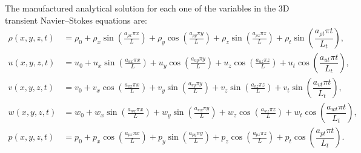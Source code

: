 \documentclass[10pt]{article}
\begin{document}
The manufactured analytical solution for each one of the variables in the 3D transient Navier--Stokes equations are:
\begin{equation}
\begin{split}
\label{eq:manufactured_3d} 
\rho\left( x ,y ,z,t\right) &=  \rho_{0}+ \rho_{x} \sin\left(\frac{a_{ \rho  x} \pi x}{L}\right)+ \rho_{y} \cos\left(\frac{a_{ \rho  y} \pi y}{L}\right) + \rho_{z} \sin\left(\frac{a_{ \rho  z} \pi z}{L}\right) + \rho_t \sin\left(\dfrac{a_{\rho t} \pi t}{L_t}\right),\\
u\left( x ,y ,z,t\right) &= u_{0}+u_{x} \sin\left(\frac{a_{u  x} \pi x}{L}\right)+u_{y} \cos\left(\frac{a_{u  y} \pi y}{L}\right)+u_{z} \cos\left(\frac{a_{u  z} \pi z}{L}\right) + u_t \cos\left(\dfrac{a_{u t} \pi t}{L_t}\right),\\
v\left( x ,y ,z,t\right) &= v_{0}+v_{x} \cos\left(\frac{a_{v  x} \pi x}{L}\right)+v_{y} \sin\left(\frac{a_{v  y} \pi y}{L}\right)+v_{z} \sin\left(\frac{a_{v  z} \pi z}{L}\right)+ v_t \sin\left(\dfrac{a_{v t} \pi t}{L_t}\right), \\
w\left( x ,y ,z,t\right) &= w_{0}+w_{x} \sin\left(\frac{a_{w  x} \pi x}{L}\right)+w_{y} \sin\left(\frac{a_{w  y} \pi y}{L}\right)+ w_{z} \cos\left(\frac{a_{w  z} \pi z}{L}\right)+ w_t \cos\left(\dfrac{a_{w t} \pi t}{L_t}\right) ,\\
p\left( x ,y ,z,t\right) &= p_{0}+p_{x} \cos\left(\frac{a_{p  x} \pi x}{L}\right)+p_{y} \sin\left(\frac{a_{p  y} \pi y}{L}\right)+ p_{z} \cos\left(\frac{a_{p  z} \pi z}{L}\right)+ p_t \cos\left(\dfrac{a_{p t} \pi t}{L_t}\right).
\end{split}
\end{equation}
\end{document}
